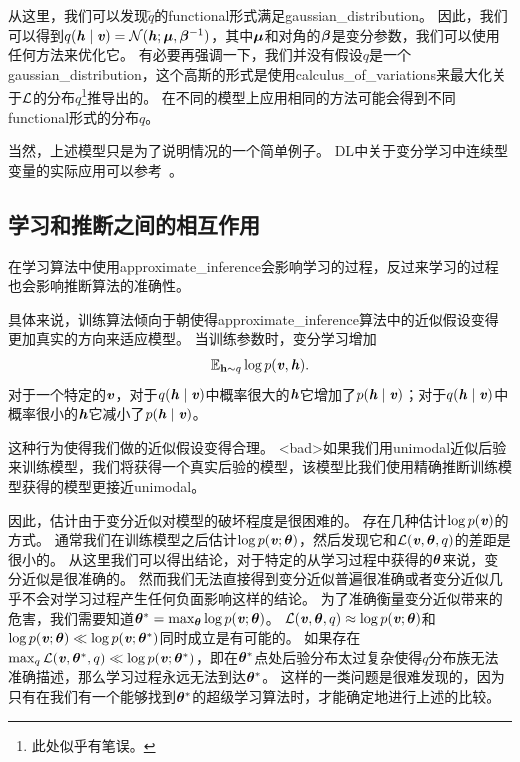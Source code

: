 从这里，我们可以发现$\tilde{q}$的\gls{functional}形式满足\gls{gaussian_distribution}。
因此，我们可以得到$q(\boldsymbol{\mathit{h}}\mid\boldsymbol{\mathit{v}}) = \mathcal{N}(\boldsymbol{\mathit{h}};\boldsymbol{\mu},\boldsymbol{\beta}^{-1})$，其中$\boldsymbol{\mu}$和对角的$\boldsymbol{\beta}$是变分参数，我们可以使用任何方法来优化它。
有必要再强调一下，我们并没有假设$q$是一个\gls{gaussian_distribution}，这个高斯的形式是使用\gls{calculus_of_variations}来最大化关于$\mathcal{L}$的分布$q$\footnote{此处似乎有笔误。}推导出的。    %
在不同的模型上应用相同的方法可能会得到不同\gls{functional}形式的分布$q$。

当然，上述模型只是为了说明情况的一个简单例子。
\gls{DL}中关于变分学习中连续型变量的实际应用可以参考~\citet{Goodfeli-et-al-TPAMI-Deep-PrePrint-2013-small}。



\subsection{学习和推断之间的相互作用}
\label{sec:interactions_between_learning_and_inference}


在学习算法中使用\gls{approximate_inference}会影响学习的过程，反过来学习的过程也会影响推断算法的准确性。


具体来说，训练算法倾向于朝使得\gls{approximate_inference}算法中的近似假设变得更加真实的方向来适应模型。
当训练参数时，变分学习增加
\begin{align}
\label{eqn:1968}
	\mathbb{E}_{\mathbf{h} \sim q}\log p(\boldsymbol{\mathit{v}},\boldsymbol{\mathit{h}}).
\end{align}
对于一个特定的$\boldsymbol{\mathit{v}}$，对于$q(\boldsymbol{\mathit{h}} \mid \boldsymbol{\mathit{v}})$中概率很大的$\boldsymbol{\mathit{h}}$它增加了$p(\boldsymbol{\mathit{h}}\mid\boldsymbol{\mathit{v}})$；对于$q(\boldsymbol{\mathit{h}} \mid \boldsymbol{\mathit{v}})$中概率很小的$\boldsymbol{\mathit{h}}$它减小了$p(\boldsymbol{\mathit{h}}\mid\boldsymbol{\mathit{v}})$。

这种行为使得我们做的近似假设变得合理。 %
<bad>如果我们用\gls{unimodal}近似后验来训练模型，我们将获得一个真实后验的模型，该模型比我们使用精确推断训练模型获得的模型更接近\gls{unimodal}。

	
因此，估计由于变分近似对模型的破坏程度是很困难的。
存在几种估计$\log p(\boldsymbol{\mathit{v}})$的方式。
通常我们在训练模型之后估计$\log p(\boldsymbol{\mathit{v}};\boldsymbol{\theta})$，然后发现它和$\mathcal{L}(\boldsymbol{\mathit{v}},\boldsymbol{\theta},q)$的差距是很小的。
从这里我们可以得出结论，对于特定的从学习过程中获得的$\boldsymbol{\theta}$来说，变分近似是很准确的。
然而我们无法直接得到变分近似普遍很准确或者变分近似几乎不会对学习过程产生任何负面影响这样的结论。
为了准确衡量变分近似带来的危害，我们需要知道$\boldsymbol{\theta}^* = \max_{\boldsymbol{\theta}} \log p(\boldsymbol{\mathit{v}};\boldsymbol{\theta})$。
$\mathcal{L}(\boldsymbol{\mathit{v}},\boldsymbol{\theta},q)\approx \log p(\boldsymbol{\mathit{v}};\boldsymbol{\theta})$和$\log p(\boldsymbol{\mathit{v}};\boldsymbol{\theta})\ll \log p(\boldsymbol{\mathit{v}};\boldsymbol{\theta}^*)$同时成立是有可能的。
如果存在$\max_q \mathcal{L}(\boldsymbol{\mathit{v}},\boldsymbol{\theta}^*,q)\ll \log p(\boldsymbol{\mathit{v}};\boldsymbol{\theta}^*)$，即在$\boldsymbol{\theta}^*$点处后验分布太过复杂使得$q$分布族无法准确描述，那么学习过程永远无法到达$\boldsymbol{\theta}^*$。
这样的一类问题是很难发现的，因为只有在我们有一个能够找到$\boldsymbol{\theta}^*$的超级学习算法时，才能确定地进行上述的比较。



